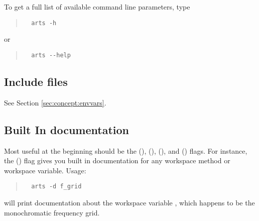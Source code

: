 To get a full list of available command line parameters, type
\begin{quote}
\begin{verbatim}
  arts -h
\end{verbatim}
\end{quote}
or
\begin{quote}
\begin{verbatim}
  arts --help
\end{verbatim}
\end{quote}


\subsection*{Include files}

See Section \ref{sec:concept:envvars}.


\subsection*{Built In documentation}

Most useful at the beginning should be the 
(),  (), 
(), and  () flags.
For instance, the  () flag gives you built in
documentation for any workspace method or workspace variable. Usage:
\begin{quote}
\begin{verbatim}
  arts -d f_grid
\end{verbatim}
\end{quote}
will print documentation about the workspace variable , which
happens to be the monochromatic frequency grid.

